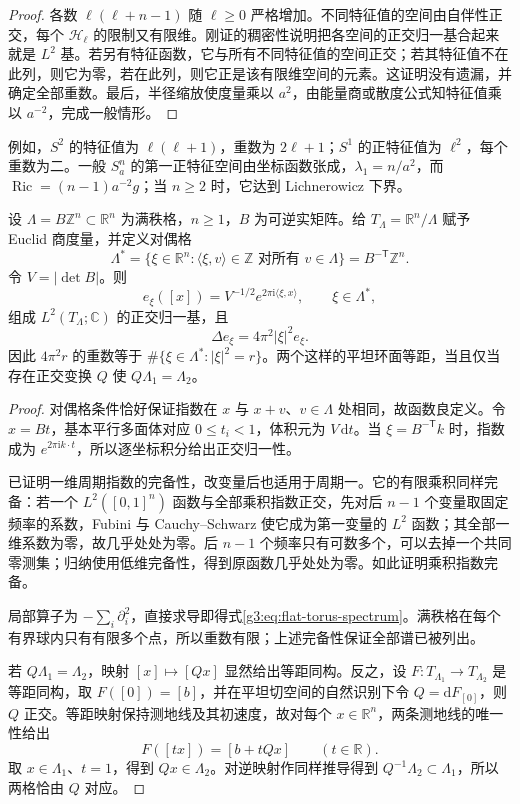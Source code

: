 \begin{proof}
	各数 \(\ell(\ell+n-1)\) 随 \(\ell\ge0\) 严格增加。不同特征值的空间由自伴性正交，每个 \(\mathcal H_\ell\) 的限制又有限维。刚证的稠密性说明把各空间的正交归一基合起来就是 \(L^2\) 基。若另有特征函数，它与所有不同特征值的空间正交；若其特征值不在此列，则它为零，若在此列，则它正是该有限维空间的元素。这证明没有遗漏，并确定全部重数。最后，半径缩放使度量乘以 \(a^2\)，由能量商或散度公式知特征值乘以 \(a^{-2}\)，完成一般情形。
\end{proof}

例如，\(S^2\) 的特征值为 \(\ell(\ell+1)\)，重数为 \(2\ell+1\)；\(S^1\) 的正特征值为 \(\ell^2\)，每个重数为二。一般 \(S_a^n\) 的第一正特征空间由坐标函数张成，\(\lambda_1=n/a^2\)，而 \(\operatorname{Ric}=(n-1)a^{-2}g\)；当 \(n\ge2\) 时，它达到 Lichnerowicz 下界。

\begin{theorem}\label{g3:thm:flat-torus-spectrum}
	设 \(\Lambda=B\mathbb Z^n\subset\mathbb R^n\) 为满秩格，\(n\ge1\)，\(B\) 为可逆实矩阵。给 \(T_\Lambda=\mathbb R^n/\Lambda\) 赋予 Euclid 商度量，并定义对偶格
	\[
		\Lambda^*=\{\xi\in\mathbb R^n:\langle\xi,v\rangle\in\mathbb Z\text{ 对所有 }v\in\Lambda\}
		=B^{-\mathsf T}\mathbb Z^n.
	\]
	令 \(V=|\det B|\)。则
	\[
		e_\xi([x])=V^{-1/2}e^{2\pi\mathrm i\langle\xi,x\rangle},\qquad \xi\in\Lambda^*,
	\]
	组成 \(L^2(T_\Lambda;\mathbb C)\) 的正交归一基，且
	\begin{equation}\label{g3:eq:flat-torus-spectrum}
		\Delta e_\xi=4\pi^2|\xi|^2e_\xi.
	\end{equation}
	因此 \(4\pi^2r\) 的重数等于 \(\#\{\xi\in\Lambda^*:|\xi|^2=r\}\)。两个这样的平坦环面等距，当且仅当存在正交变换 \(Q\) 使 \(Q\Lambda_1=\Lambda_2\)。
\end{theorem}
\begin{proof}
	对偶格条件恰好保证指数在 \(x\) 与 \(x+v\)、\(v\in\Lambda\) 处相同，故函数良定义。令 \(x=Bt\)，基本平行多面体对应 \(0\le t_i<1\)，体积元为 \(V\,\mathrm dt\)。当 \(\xi=B^{-\mathsf T}k\) 时，指数成为 \(e^{2\pi\mathrm i k\cdot t}\)，所以逐坐标积分给出正交归一性。

	已证明一维周期指数的完备性，改变量后也适用于周期一。它的有限乘积同样完备：若一个 \(L^2([0,1]^n)\) 函数与全部乘积指数正交，先对后 \(n-1\) 个变量取固定频率的系数，Fubini 与 Cauchy--Schwarz 使它成为第一变量的 \(L^2\) 函数；其全部一维系数为零，故几乎处处为零。后 \(n-1\) 个频率只有可数多个，可以去掉一个共同零测集；归纳使用低维完备性，得到原函数几乎处处为零。如此证明乘积指数完备。

	局部算子为 \(-\sum_i\partial_i^2\)，直接求导即得式\eqref{g3:eq:flat-torus-spectrum}。满秩格在每个有界球内只有有限多个点，所以重数有限；上述完备性保证全部谱已被列出。

	若 \(Q\Lambda_1=\Lambda_2\)，映射 \([x]\mapsto[Qx]\) 显然给出等距同构。反之，设 \(F:T_{\Lambda_1}\to T_{\Lambda_2}\) 是等距同构，取 \(F([0])=[b]\)，并在平坦切空间的自然识别下令 \(Q=\mathrm dF_{[0]}\)，则 \(Q\) 正交。等距映射保持测地线及其初速度，故对每个 \(x\in\mathbb R^n\)，两条测地线的唯一性给出
	\[
		F([tx])=[b+tQx]\qquad(t\in\mathbb R).
	\]
	取 \(x\in\Lambda_1\)、\(t=1\)，得到 \(Qx\in\Lambda_2\)。对逆映射作同样推导得到 \(Q^{-1}\Lambda_2\subset\Lambda_1\)，所以两格恰由 \(Q\) 对应。
\end{proof}

